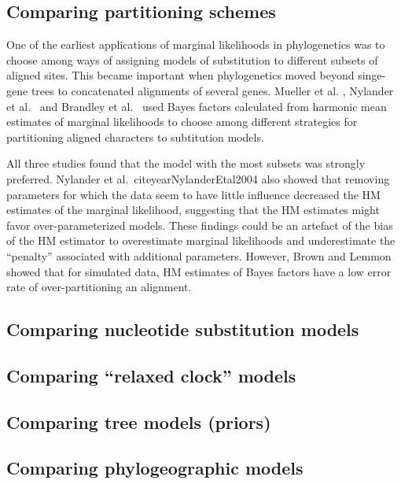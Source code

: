\subsection{Comparing partitioning schemes}

One of the earliest applications of marginal likelihoods in phylogenetics was
to choose among ways of assigning models of substitution to different subsets
of aligned sites.
This became important when phylogenetics moved beyond singe-gene trees to
concatenated alignments of several genes.
Mueller et al. \citeyear{Mueller2004},
Nylander et al.\ \citeyear{NylanderEtal2004} and
Brandley et al.\ \citeyear{Brandley2005}
used Bayes factors calculated from harmonic mean
estimates of marginal likelihoods to choose among different strategies for
partitioning aligned characters to subtitution models.

All three studies found that the model with the most subsets was strongly
preferred.
Nylander et al.\ citeyear{NylanderEtal2004} also showed that removing
parameters for which the data seem to have little influence decreased
the HM estimates of the marginal likelihood, suggesting that the HM
estimates might favor over-parameterized models.
These findings could be an artefact of the bias of the HM estimator to
overestimate marginal likelihoods and underestimate the ``penalty'' associated
with additional parameters.
However, Brown and Lemmon \citeyear{Brown2007} showed that for simulated data,
HM estimates of Bayes factors have a low error rate of over-partitioning an
alignment.

\subsection{Comparing nucleotide substitution models}

\subsection{Comparing ``relaxed clock'' models}

\citep{Lepage2007}

\subsection{Comparing tree models (priors)}

\subsection{Comparing phylogeographic models}

